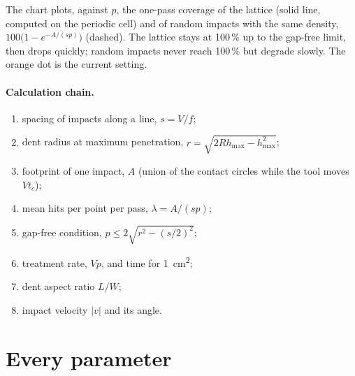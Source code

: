 \documentclass[11pt,a4paper]{article}
\begin{document}
The chart plots, against $p$, the one-pass coverage of the lattice (solid line, computed on the periodic cell) and of random impacts with the same density, $100\bigl(1-e^{-A/(sp)}\bigr)$ (dashed). The lattice stays at 100\,\% up to the gap-free limit, then drops quickly; random impacts never reach 100\,\% but degrade slowly. The orange dot is the current setting.

\paragraph{Calculation chain.}
\begin{enumerate}[nosep,label=c\arabic*]
\item spacing of impacts along a line, $s=V/f$;
\item dent radius at maximum penetration, $r=\sqrt{2Rh_\mathrm{max}-h_\mathrm{max}^2}$;
\item footprint of one impact, $A$ (union of the contact circles while the tool moves $Vt_c$);
\item mean hits per point per pass, $\lambda=A/(sp)$;
\item gap-free condition, $p\le2\sqrt{r^2-(s/2)^2}$;
\item treatment rate, $Vp$, and time for \SI{1}{cm^2};
\item dent aspect ratio $L/W$;
\item impact velocity $|v|$ and its angle.
\end{enumerate}

\section{Every parameter}\label{sec:params}
\end{document}

